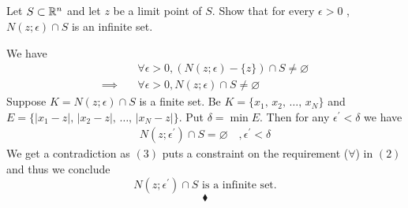 \subsection{}
\begin{tcolorbox}
Let $S\subset \mathbb{R}^n$  and let $z$ be a limit point of $S$. Show that for every $\epsilon > 0$ , $N(z; \epsilon)\cap S$ is an infinite set.
\end{tcolorbox}
We have 
\begin{align}
&\forall  \epsilon >0, \left(N(z;\epsilon)-\{z\}\right)\cap S\neq \varnothing\\
\implies \quad &\forall  \epsilon >0, N(z;\epsilon)\cap S\neq \varnothing
\end{align}
Suppose $K=N(z;\epsilon)\cap S$ is a finite set. Be $K=\{x_1,\, x_2,\, \dots ,\, x_N\}$ and $E=\{|x_1-z|,\, |x_2-z|,\, \dots ,\, |x_N-z|\}$. Put $\delta = \min{E}$. Then for any $\epsilon^{'}<\delta $ we have 
\begin{align}
N(z;\epsilon^{'})\cap S=\varnothing\quad , \epsilon^{'}<\delta 
\end{align}
We get a contradiction as $(3)$ puts a constraint on the requirement ($\forall$) in  $(2)$  and thus we conclude \\
$$N(z;\epsilon^{'})\cap S\text{ is a infinite set.}$$
$$\blacklozenge$$\\


